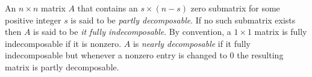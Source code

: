 \documentclass[12pt]{article}
\begin{document}
 An  $n\times n$ matrix $A$   that contains an $s \times (n-s)$ zero submatrix for some positive integer $s$ is said to be {\it partly decomposable}. If no such submatrix exists then $A$
is said to be \emph{ it fully  indecomposable}. 
By convention, a $1 \times 1$ matrix is fully indecomposable if it is nonzero.
$A$ is {\it nearly decomposable} if it fully indecomposable but whenever a nonzero  entry is changed to 0 the resulting matrix is partly decomposable.



\end{document}
